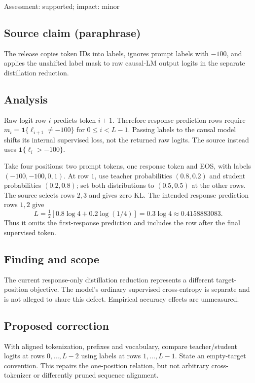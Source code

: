 \documentclass[11pt]{article}
\begin{document}
Assessment: supported; impact: minor

\subsection*{Source claim (paraphrase)}

The release copies token IDs into labels, ignores prompt labels with \(-100\), and applies the unshifted label mask to raw causal-LM output logits in the separate distillation reduction.

\subsection*{Analysis}

Raw logit row \(i\) predicts token \(i+1\). Therefore response prediction rows require \(m_i=\mathbf1\{\ell_{i+1}\ne-100\}\) for \(0\leq i<L-1\). Passing labels to the causal model shifts its internal supervised loss, not the returned raw logits. The source instead uses \(\mathbf1\{\ell_i>-100\}\).

Take four positions: two prompt tokens, one response token and EOS, with labels \((-100,-100,0,1)\). At row \(1\), use teacher probabilities \((0.8,0.2)\) and student probabilities \((0.2,0.8)\); set both distributions to \((0.5,0.5)\) at the other rows. The source selects rows \(2,3\) and gives zero KL. The intended response prediction rows \(1,2\) give \[L=\tfrac12[0.8\log4+0.2\log(1/4)]=0.3\log4\approx0.4158883083.\] Thus it omits the first-response prediction and includes the row after the final supervised token.

\subsection*{Finding and scope}

The current response-only distillation reduction represents a different target-position objective. The model’s ordinary supervised cross-entropy is separate and is not alleged to share this defect. Empirical accuracy effects are unmeasured.

\subsection*{Proposed correction}

With aligned tokenization, prefixes and vocabulary, compare teacher/student logits at rows \(0,\ldots,L-2\) using labels at rows \(1,\ldots,L-1\). State an empty-target convention. This repairs the one-position relation, but not arbitrary cross-tokenizer or differently pruned sequence alignment.
\end{document}
